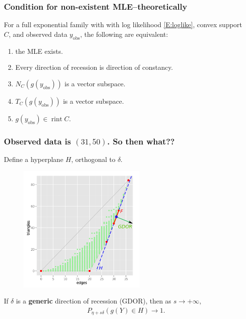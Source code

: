 \documentclass[slidestop,compress, 10pt]{beamer}
\DeclareMathOperator{\rint}{rint}
\newcommand{\yobs}{y_{\text{obs}}}
\begin{document}
\frame
{
  \frametitle{Condition for non-existent MLE--theoretically}  
\begin{theorem}
For a full exponential family with with log likelihood \eqref{E:loglike}, convex support $C$, and observed data $\yobs$, the following are equivalent:
\begin{enumerate}
\item the MLE exists.
\item Every direction of recession is direction of constancy.
\item $N_C(g(\yobs))$ is a vector subspace.
\item $T_C(g(\yobs))$ is a vector subspace.
\item $g(\yobs) \in \rint C$.
\end{enumerate}
\end{theorem}
}

\frame
{
	\frametitle{Observed data is $(31,50)$.  So then what??}

Define a hyperplane $H$, orthogonal to $\delta$.
\begin{figure}[h]
\centering
\includegraphics[height=2.5in]{g9-H.png}
\end{figure}
	If $\delta$ is a \textbf{generic} direction of recession (GDOR), then as $s \to +\infty$,
\begin{align*}
		P_{\eta + s \delta}( g(Y) \in H) \to 1.
\end{align*}
}
\end{document}
